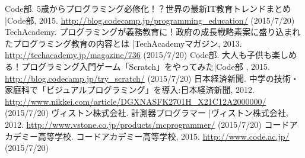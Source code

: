 \documentclass[openany,11pt,papersize]{jsbook}
\begin{document}

\begin{thebibliography}{9}
  Code部. 5歳からプログラミング必修化！？世界の最新IT教育トレンドまとめ |Code部,  2015. \url{http://blog.codecamp.jp/programming_education/} (2015/7/20)
  TechAcademy. プログラミングが義務教育に！政府の成長戦略素案に盛り込まれたプログラミング教育の内容とは |TechAcademyマガジン,  2013. \url{http://techacademy.jp/magazine/736} (2015/7/20)
   Code部. 大人も子供も楽しめる！プログラミング入門ゲーム「Scratch」をやってみた|Code部 ,  2015. \url{http://blog.codecamp.jp/try_scratch/} (2015/7/20)
  日本経済新聞. 中学の技術・家庭科で「ビジュアルプログラミング」を導入:日本経済新聞,  2012. \url{http://www.nikkei.com/article/DGXNASFK2701H_X21C12A2000000/} (2015/7/20)
  ヴィストン株式会社. 計測器プログラマー |ヴィストン株式会社,  2012. \url{http://www.vstone.co.jp/products/mcprogrammer/} (2015/7/20)
   コードアカデミー高等学校. コードアカデミー高等学校,  2015. \url{http://www.code.ac.jp/} (2015/7/20)
\end{thebibliography}
\end{document}
